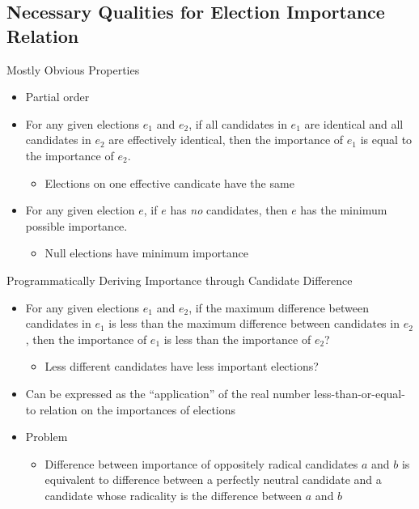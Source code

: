 \documentclass{beamer}
\begin{document}
\subsection{Necessary Qualities for Election Importance Relation}

\begin{frame}{Mostly Obvious Properties}
\begin{itemize}
  \item Partial order
  \item For any given elections \(e_1\) and \(e_2\), if all candidates in \(e_1\) are identical and all candidates in \(e_2\) are effectively identical, then the importance of \(e_1\) is equal to the importance of \(e_2\).
  \begin{itemize}
    \item Elections on one effective candicate have the same
  \end{itemize}
  \item For any given election \(e\), if \(e\) has \emph{no} candidates, then \(e\) has the minimum possible importance.
  \begin{itemize}
    \item Null elections have minimum importance
  \end{itemize}
\end{itemize}
\end{frame}

\begin{frame}{Programmatically Deriving Importance through Candidate Difference}
\begin{itemize}
  \item For any given elections \(e_1\) and \(e_2\), if the maximum difference between candidates in \(e_1\) is less than the maximum difference between candidates in \(e_2\), then the importance of \(e_1\) is less than the importance of \(e_2\)?
  \begin{itemize}
    \item Less different candidates have less important elections?
  \end{itemize}
  \item Can be expressed as the ``application'' of the real number less-than-or-equal-to relation on the importances of elections
  \item Problem
  \begin{itemize}
    \item Difference between importance of oppositely radical candidates \(a\) and \(b\) is equivalent to difference between a perfectly neutral candidate and a candidate whose radicality is the difference between \(a\) and \(b\)
  \end{itemize}
\end{itemize}
\end{frame}
\end{document}
